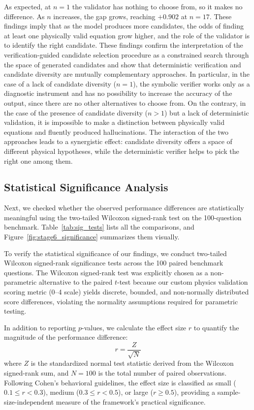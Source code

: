 \documentclass[a4paper,fleqn]{cas-sc}
\begin{document}
As expected, at $n=1$ the validator has nothing to choose from, so it makes no difference. As $n$ increases, the gap grows, reaching $+0.902$ at $n=17$. These findings imply that as the model produces more candidates, the odds of finding at least one physically valid equation grow higher, and the role of the validator is to identify the right candidate. These findings confirm the interpretation of the verification-guided candidate selection procedure as a constrained search through the space of generated candidates and show that deterministic verification and candidate diversity are mutually complementary approaches. In particular, in the case of a lack of candidate diversity ($n = 1$), the symbolic verifier works only as a diagnostic instrument and has no possibility to increase the accuracy of the output, since there are no other alternatives to choose from. On the contrary, in the case of the presence of candidate diversity ($n > 1$) but a lack of deterministic validation, it is impossible to make a distinction between physically valid equations and fluently produced hallucinations. The interaction of the two approaches leads to a synergistic effect: candidate diversity offers a space of different physical hypotheses, while the deterministic verifier helps to pick the right one among them.


\subsection{Statistical Significance Analysis}
Next, we checked whether the observed performance differences are statistically meaningful using the two-tailed Wilcoxon signed-rank test on the 100-question benchmark. Table~\ref{tab:sig_tests} lists all the comparisons, and Figure~\ref{fig:stage6_significance} summarizes them visually.

To verify the statistical significance of our findings, we conduct two-tailed Wilcoxon signed-rank significance tests \citep{wilcoxon1945individual} across the 100 paired benchmark questions. The Wilcoxon signed-rank test was explicitly chosen as a non-parametric alternative to the paired $t$-test because our custom physics validation scoring metric (0--4 scale) yields discrete, bounded, and non-normally distributed score differences, violating the normality assumptions required for parametric testing.

In addition to reporting $p$-values, we calculate the effect size $r$ to quantify the magnitude of the performance difference:
\begin{equation*}
r = \frac{Z}{\sqrt{N}}
\end{equation*}
where $Z$ is the standardized normal test statistic derived from the Wilcoxon signed-rank sum, and $N = 100$ is the total number of paired observations. Following Cohen's behavioral guidelines, the effect size is classified as small ($0.1 \le r < 0.3$), medium ($0.3 \le r < 0.5$), or large ($r \ge 0.5$), providing a sample-size-independent measure of the framework's practical significance.
\end{document}
